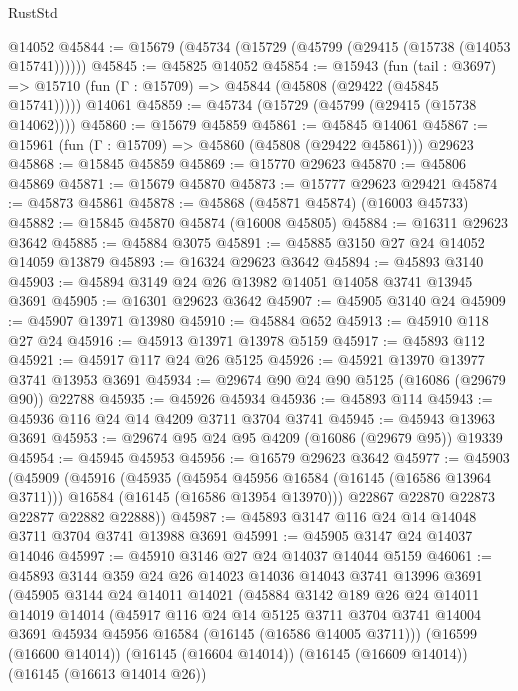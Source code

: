 \begin{lexlean}{RustStd}
\begin{coremodule}
    @14052
@45844 := @15679 (@45734 (@15729 (@45799 (@29415 (@15738 (@14053 @15741))))))
@45845 := @45825 @14052
@45854 := @15943
    (fun (tail : @3697) => @15710 (fun (Γ : @15709) => @45844 (@45808 (@29422 (@45845 @15741)))))
    @14061
@45859 := @45734 (@15729 (@45799 (@29415 (@15738 @14062))))
@45860 := @15679 @45859
@45861 := @45845 @14061
@45867 := @15961 (fun (Γ : @15709) => @45860 (@45808 (@29422 @45861))) @29623
@45868 := @15845 @45859
@45869 := @15770 @29623
@45870 := @45806 @45869
@45871 := @15679 @45870
@45873 := @15777 @29623 @29421
@45874 := @45873 @45861
@45878 := @45868 (@45871 @45874) (@16003 @45733)
@45882 := @15845 @45870 @45874 (@16008 @45805)
@45884 := @16311 @29623 @3642
@45885 := @45884 @3075
@45891 := @45885 @3150 @27 @24 @14052 @14059 @13879
@45893 := @16324 @29623 @3642
@45894 := @45893 @3140
@45903 := @45894 @3149 @24 @26 @13982 @14051 @14058 @3741 @13945 @3691
@45905 := @16301 @29623 @3642
@45907 := @45905 @3140 @24
@45909 := @45907 @13971 @13980
@45910 := @45884 @652
@45913 := @45910 @118 @27 @24
@45916 := @45913 @13971 @13978 @5159
@45917 := @45893 @112
@45921 := @45917 @117 @24 @26 @5125
@45926 := @45921 @13970 @13977 @3741 @13953 @3691
@45934 := @29674 @90 @24 @90 @5125 (@16086 (@29679 @90)) @22788
@45935 := @45926 @45934
@45936 := @45893 @114
@45943 := @45936 @116 @24 @14 @4209 @3711 @3704 @3741
@45945 := @45943 @13963 @3691
@45953 := @29674 @95 @24 @95 @4209 (@16086 (@29679 @95)) @19339
@45954 := @45945 @45953
@45956 := @16579 @29623 @3642
@45977 := @45903
    (@45909
      (@45916
        (@45935
          (@45954 @45956 @16584 (@16145 (@16586 @13964 @3711)))
          @16584
          (@16145 (@16586 @13954 @13970)))
        @22867
        @22870
        @22873
        @22877
        @22882
        @22888))
@45987 := @45893 @3147 @116 @24 @14 @14048 @3711 @3704 @3741 @13988 @3691
@45991 := @45905 @3147 @24 @14037 @14046
@45997 := @45910 @3146 @27 @24 @14037 @14044 @5159
@46061 := @45893
    @3144
    @359
    @24
    @26
    @14023
    @14036
    @14043
    @3741
    @13996
    @3691
    (@45905
      @3144
      @24
      @14011
      @14021
      (@45884
        @3142
        @189
        @26
        @24
        @14011
        @14019
        @14014
        (@45917
          @116
          @24
          @14
          @5125
          @3711
          @3704
          @3741
          @14004
          @3691
          @45934
          @45956
          @16584
          (@16145 (@16586 @14005 @3711)))
        (@16599 (@16600 @14014))
        (@16145 (@16604 @14014))
        (@16145 (@16609 @14014))
        (@16145 (@16613 @14014 @26))

\end{coremodule}
\end{lexlean}
